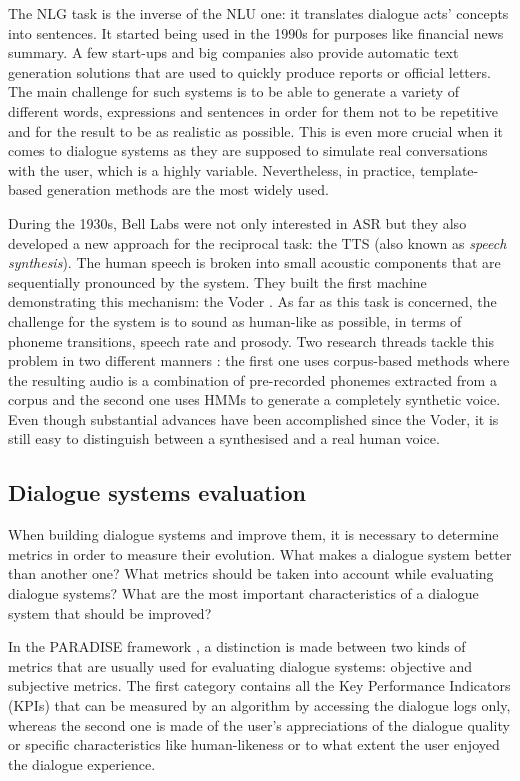 		The NLG task is the inverse of the NLU one: it translates dialogue acts' concepts into sentences. It started being used in the 1990s for purposes like financial news summary. A few start-ups and big companies also provide automatic text generation solutions that are used to quickly produce reports or official letters. The main challenge for such systems is to be able to generate a variety of different words, expressions and sentences in order for them not to be repetitive and for the result to be as realistic as possible. This is even more crucial when it comes to dialogue systems as they are supposed to simulate real conversations with the user, which is a highly variable. Nevertheless, in practice, template-based generation methods are the most widely used.

		During the 1930s, Bell Labs were not only interested in ASR but they also developed a new approach for the reciprocal task: the TTS (also known as \textit{speech synthesis}). The human speech is broken into small acoustic components that are sequentially pronounced by the system. They built the first machine demonstrating this mechanism: the Voder \cite{Dudley1939}. As far as this task is concerned, the challenge for the system is to sound as human-like as possible, in terms of phoneme transitions, speech rate and prosody. Two research threads tackle this problem in two different manners \cite{Tabet2011}: the first one uses corpus-based methods where the resulting audio is a combination of pre-recorded phonemes extracted from a corpus and the second one uses HMMs to generate a completely synthetic voice. Even though substantial advances have been accomplished since the Voder, it is still easy to distinguish between a synthesised and a real human voice.

	\subsection{Dialogue systems evaluation}

		When building dialogue systems and improve them, it is necessary to determine metrics in order to measure their evolution. What makes a dialogue system better than another one? What metrics should be taken into account while evaluating dialogue systems? What are the most important characteristics of a dialogue system that should be improved?

		In the PARADISE framework \cite{Walker1997}, a distinction is made between two kinds of metrics that are usually used for evaluating dialogue systems: objective and subjective metrics. The first category contains all the Key Performance Indicators (KPIs) that can be measured by an algorithm by accessing the dialogue logs only, whereas the second one is made of the user's appreciations of the dialogue quality or specific characteristics like human-likeness or to what extent the user enjoyed the dialogue experience.

